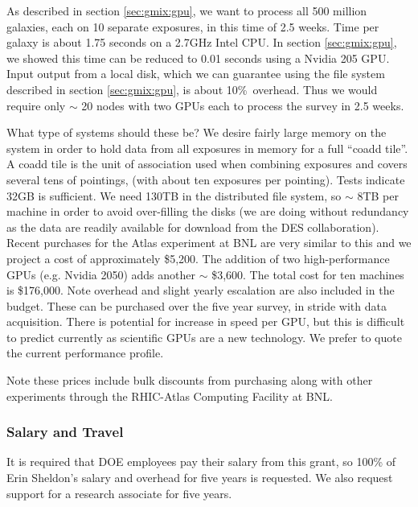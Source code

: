 \documentclass[12pt]{article}
\newcommand{\iooverhead}{10\%}
\begin{document}
As described in section \ref{sec:gmix:gpu}, we want to process all 500 million
galaxies, each on 10 separate exposures, in this time of 2.5 weeks. Time per
galaxy is about 1.75 seconds on a 2.7GHz Intel CPU. In section
\ref{sec:gmix:gpu}, we showed this time can be reduced to 0.01 seconds using a
Nvidia 205 GPU.  Input output from a local disk, which we can guarantee using
the file system described in section \ref{sec:gmix:gpu}, is about \iooverhead\
overhead.  Thus we would require only $\sim$ 20 nodes with two GPUs each to
process the survey in 2.5 weeks. 

What type of systems should these be?  We desire fairly large memory on the
system in order to hold data from all exposures in memory for a full ``coadd
tile''. A coadd tile is the unit of association used when combining exposures
and covers several tens of pointings, (with about ten exposures per pointing).
Tests indicate 32GB is sufficient.  We need 130TB in the distributed file
system, so $\sim$ 8TB per machine in order to avoid over-filling the disks (we
are doing without redundancy as the data are readily available for download
from the DES collaboration).  Recent purchases for the Atlas experiment at BNL
are very similar to this and we project a cost of approximately \$5,200.  The
addition of two high-performance GPUs (e.g. Nvidia 2050) adds another $\sim$
\$3,600.  The total cost for ten machines is \$176,000.  Note overhead and
slight yearly escalation are also included in the budget.  These can be
purchased over the five year survey, in stride with data acquisition.  There is
potential for increase in speed per GPU, but this is difficult to predict
currently as scientific GPUs are a new technology.  We prefer to quote the
current performance profile.

Note these prices include bulk discounts from purchasing along with other
experiments through the RHIC-Atlas Computing Facility at BNL.  



\subsubsection{Salary and Travel}

It is required that DOE employees pay their salary from this grant, so 100\% of
Erin Sheldon's salary and overhead for five years is requested.  We also request
support for a research associate for five years.
\end{document}
